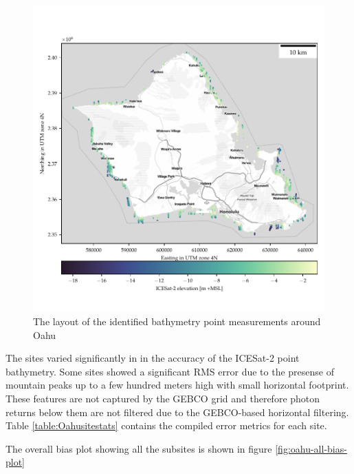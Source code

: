 \begin{figure}[h]
    \centering
    \includegraphics[width=\textwidth]{figures/Oahu_all_sites_photon_points.pdf}
    \caption{The layout of the identified bathymetry point measurements around Oahu}
    \label{fig:oahu-all-photon-map}
\end{figure}

The sites varied significantly in in the accuracy of the ICESat-2 point bathymetry. Some sites showed a significant RMS error due to the presense of mountain peaks up to a few hundred meters high with small horizontal footprint. These features are not captured by the GEBCO grid and therefore photon returns below them are not filtered due to the GEBCO-based horizontal filtering. Table \ref{table:Oahusitestats} contains the compiled error metrics for each site.

 



The overall bias plot showing all the subsites is shown in figure \ref{fig:oahu-all-bias-plot}

